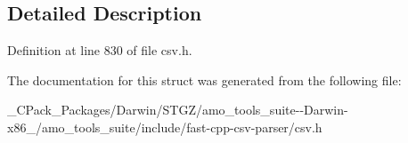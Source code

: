 \subsection{Detailed Description}


Definition at line 830 of file csv.\+h.



The documentation for this struct was generated from the following file\+:\begin{DoxyCompactItemize}
\item 
\+\_\+\+C\+Pack\+\_\+\+Packages/\+Darwin/\+S\+T\+G\+Z/amo\+\_\+tools\+\_\+suite-\/-\/\+Darwin-\/x86\+\_/amo\+\_\+tools\+\_\+suite/include/fast-\/cpp-\/csv-\/parser/csv.\+h\end{DoxyCompactItemize}
